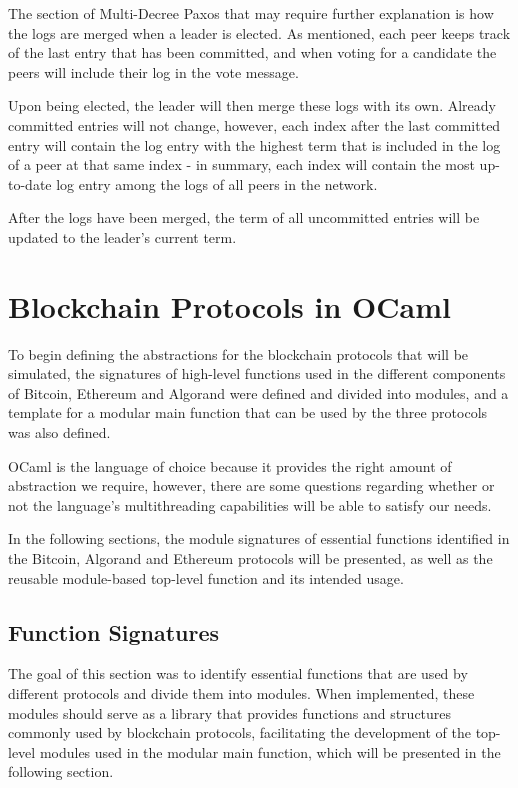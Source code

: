 \vspace{0.2cm}

The section of Multi-Decree Paxos that may require further explanation is how the logs are merged when a leader is elected. As mentioned, each peer keeps track of the last entry that has been committed, and when voting for a candidate the peers will include their log in the vote message.

Upon being elected, the leader will then merge these logs with its own. Already committed entries will not change, however, each index after the last committed entry will contain the log entry with the highest term that is included in the log of a peer at that same index - in summary, each index will contain the most up-to-date log entry among the logs of all peers in the network.

After the logs have been merged, the term of all uncommitted entries will be updated to the leader's current term.





\section{Blockchain Protocols in OCaml}

To begin defining the abstractions for the blockchain protocols that will be simulated, the signatures of high-level functions used in the different components of Bitcoin, Ethereum and Algorand were defined and divided into modules, and a template for a modular main function that can be used by the three protocols was also defined.

OCaml is the language of choice because it provides the right amount of abstraction we require, however, there are some questions regarding whether or not the language's multithreading capabilities will be able to satisfy our needs.

In the following sections, the module signatures of essential functions identified in the Bitcoin, Algorand and Ethereum protocols will be presented, as well as the reusable module-based top-level function and its intended usage.

\subsection{Function Signatures}

The goal of this section was to identify essential functions that are used by different protocols and divide them into modules. When implemented, these modules should serve as a library that provides functions and structures commonly used by blockchain protocols, facilitating the development of the top-level modules used in the modular main function, which will be presented in the following section.


